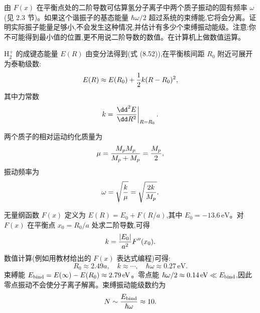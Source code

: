 \begin{question}
由 $F(x)$ 在平衡点处的二阶导数可估算氢分子离子中两个质子振动的固有频率 $\omega$(见 2.3 节)。如果这个谐振子的基态能量 $\hbar\omega/2$ 超过系统的束缚能,它将会分离。证明实际振子能量足够小,不会发生这种情况,并估计有多少个束缚振动能级。注意:你不可能得到最小值的位置,更不用说二阶导数的数值。在计算机上做数值运算。
\begin{solution}
$\mathrm H_2^+$ 的成键态能量 $E(R)$ 由变分法得到(式 (8.52)),在平衡核间距 $R_0$ 附近可展开为泰勒级数:
\[
E(R)\approx E(R_0)+{1\over2}k(R-R_0)^2,
\]
其中力常数
\[
k=\left.{\dd^2E\over\dd R^2}\right|_{R=R_0}.
\]

两个质子的相对运动约化质量为
\[
\mu={M_pM_p\over M_p+M_p}={M_p\over2},
\]
振动频率为
\[
\omega=\sqrt{k\over\mu}=\sqrt{2k\over M_p}.
\]

无量纲函数 $F(x)$ 定义为 $E(R)=E_0+F(R/a)$,其中 $E_0=-13.6\,\mathrm{eV}$。对 $F(x)$ 在平衡点 $x_0=R_0/a$ 处求二阶导数,可得
\[
k={|E_0|\over a^2}F''(x_0).
\]
数值计算(例如用教材给出的 $F(x)$ 表达式编程)可得:
\[
R_0\approx2.49a,\quad k\approx\cdots,\quad
\hbar\omega\approx0.27\,\mathrm{eV}.
\]
束縛能 $E_{\rm bind}=E(\infty)-E(R_0)\approx2.79\,\mathrm{eV}$。零点能 $\hbar\omega/2\approx0.14\,\mathrm{eV}\ll E_{\rm bind}$,因此零点振动不会使分子离子解离。束缚振动能级数约为
\[
N\sim{E_{\rm bind}\over\hbar\omega}\approx10.
\]
\end{solution}
\end{question}

